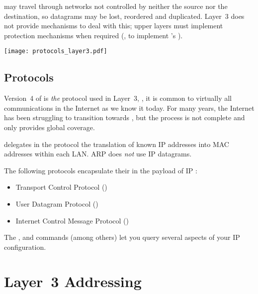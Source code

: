 may travel through networks not controlled 
by neither the source nor the destination, so datagrams may be lost, reordered and duplicated.
% 
Layer~3 does not provide mechanisms to deal with this; upper layers must implement
protection mechanisms when required 
(\eg, to implement 's ).

\begin{center}
\texttt{[image: protocols\_layer3.pdf]}
\end{center}


\vspace{-0.25cm}
\subsection*{Protocols}

Version~4 of  is \textit{the} protocol used in Layer~3, \ie,
it is common to virtually all communications in the Internet as we know it today.
% 
For many years, the Internet has been struggling to transition towards , 
but the process is not complete and only  provides global coverage.

 delegates in the  protocol the translation of known IP addresses 
into MAC addresses within each LAN. ARP does \textit{not} use IP datagrams.

The following protocols encapsulate their  in the payload of IP 
:\\[-0.6cm]
\begin{itemize}
\item Transport Control Protocol () 
\item User Datagram Protocol ()
\item Internet Control Message Protocol ()
\end{itemize}

\begin{remark}
The ,  and  commands 
(among others) let you query several aspects of your IP configuration.
\end{remark}



\section{Layer~3 Addressing}

